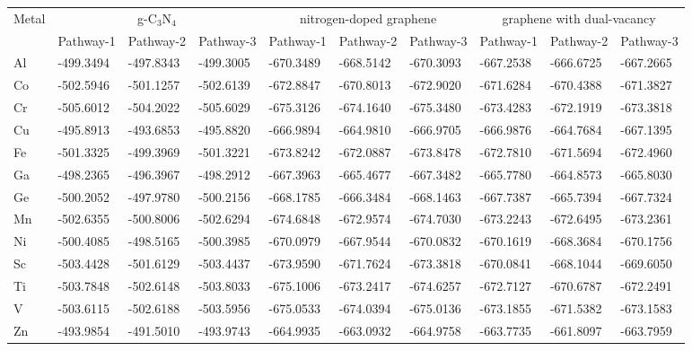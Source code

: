\begin{table}[h]
  \centering
  {\fontsize{6}{12}\selectfont
  \begin{tabular}{*{10}{l}}
      \hline
      \multirow{2}{*}{Metal} & \multicolumn{3}{c}{g-C$_3$N$_4$}  & \multicolumn{3}{c}{nitrogen-doped graphene} & \multicolumn{3}{c}{graphene with dual-vacancy}               \\ \cline{2-10}
                             & Pathway-1 & Pathway-2 & Pathway-3 & Pathway-1 & Pathway-2 & Pathway-3           & Pathway-1 & Pathway-2 & Pathway-3  \\
      \hline
      Al & -499.3494 & -497.8343 & -499.3005 & -670.3489 & -668.5142 & -670.3093 & -667.2538 & -666.6725 & -667.2665 \\
      Co & -502.5946 & -501.1257 & -502.6139 & -672.8847 & -670.8013 & -672.9020 & -671.6284 & -670.4388 & -671.3827 \\
      Cr & -505.6012 & -504.2022 & -505.6029 & -675.3126 & -674.1640 & -675.3480 & -673.4283 & -672.1919 & -673.3818 \\
      Cu & -495.8913 & -493.6853 & -495.8820 & -666.9894 & -664.9810 & -666.9705 & -666.9876 & -664.7684 & -667.1395 \\
      Fe & -501.3325 & -499.3969 & -501.3221 & -673.8242 & -672.0887 & -673.8478 & -672.7810 & -671.5694 & -672.4960 \\
      Ga & -498.2365 & -496.3967 & -498.2912 & -667.3963 & -665.4677 & -667.3482 & -665.7780 & -664.8573 & -665.8030 \\
      Ge & -500.2052 & -497.9780 & -500.2156 & -668.1785 & -666.3484 & -668.1463 & -667.7387 & -665.7394 & -667.7324 \\
      Mn & -502.6355 & -500.8006 & -502.6294 & -674.6848 & -672.9574 & -674.7030 & -673.2243 & -672.6495 & -673.2361 \\
      Ni & -500.4085 & -498.5165 & -500.3985 & -670.0979 & -667.9544 & -670.0832 & -670.1619 & -668.3684 & -670.1756 \\
      Sc & -503.4428 & -501.6129 & -503.4437 & -673.9590 & -671.7624 & -673.3818 & -670.0841 & -668.1044 & -669.6050 \\
      Ti & -503.7848 & -502.6148 & -503.8033 & -675.1006 & -673.2417 & -674.6257 & -672.7127 & -670.6787 & -672.2491 \\
      V  & -503.6115 & -502.6188 & -503.5956 & -675.0533 & -674.0394 & -675.0136 & -673.1855 & -671.5382 & -673.1583 \\
      Zn & -493.9854 & -491.5010 & -493.9743 & -664.9935 & -663.0932 & -664.9758 & -663.7735 & -661.8097 & -663.7959 \\

\end{tabular}}
\end{table}
